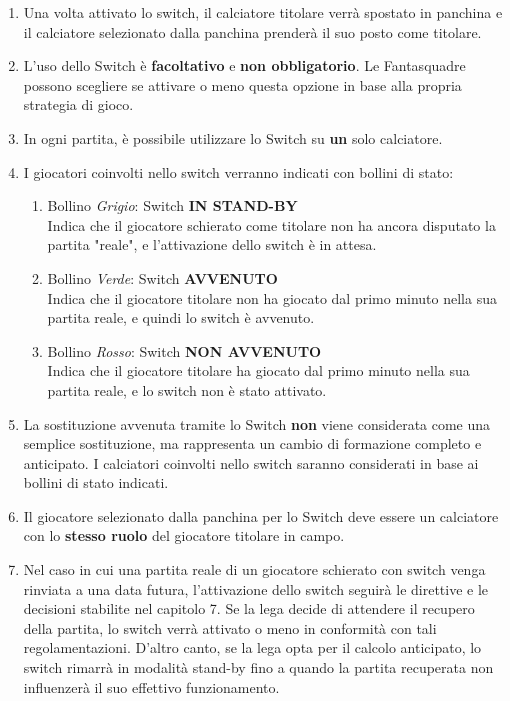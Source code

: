 \documentclass[12pt]{article}
\begin{document}
\begin{enumerate}
    \item Una volta attivato lo switch, il calciatore titolare verrà spostato in panchina e il calciatore selezionato dalla panchina prenderà il suo posto come titolare.
    \item L'uso dello Switch è \textbf{facoltativo} e \textbf{non obbligatorio}. Le Fantasquadre possono scegliere se attivare o meno questa opzione in base alla propria strategia di gioco.
    \item In ogni partita, è possibile utilizzare lo Switch su \textbf{un} solo calciatore.
    \item I giocatori coinvolti nello switch verranno indicati con bollini di stato:
    \begin{enumerate}
        \item Bollino \textit{Grigio}: Switch \textbf{IN STAND-BY} \\ Indica che il giocatore schierato come titolare non ha ancora disputato la partita "reale", e l'attivazione dello switch è in attesa.
        \item Bollino \textit{Verde}: Switch \textbf{AVVENUTO} \\ Indica che il giocatore titolare non ha giocato dal primo minuto nella sua partita reale, e quindi lo switch è avvenuto.
        \item Bollino \textit{Rosso}: Switch \textbf{NON AVVENUTO} \\ Indica che il giocatore titolare ha giocato dal primo minuto nella sua partita reale, e lo switch non è stato attivato.
    \end{enumerate}
    \item La sostituzione avvenuta tramite lo Switch \textbf{non} viene considerata come una semplice sostituzione, ma rappresenta un cambio di formazione completo e anticipato. I calciatori coinvolti nello switch saranno considerati in base ai bollini di stato indicati.
    \item Il giocatore selezionato dalla panchina per lo Switch deve essere un calciatore con lo \textbf{stesso ruolo} del giocatore titolare in campo.
    \item Nel caso in cui una partita reale di un giocatore schierato con switch venga rinviata a una data futura, l'attivazione dello switch seguirà le direttive e le decisioni stabilite nel capitolo 7. Se la lega decide di attendere il recupero della partita, lo switch verrà attivato o meno in conformità con tali regolamentazioni. D'altro canto, se la lega opta per il calcolo anticipato, lo switch rimarrà in modalità stand-by fino a quando la partita recuperata non influenzerà il suo effettivo funzionamento.
\end{enumerate}
\end{document}
